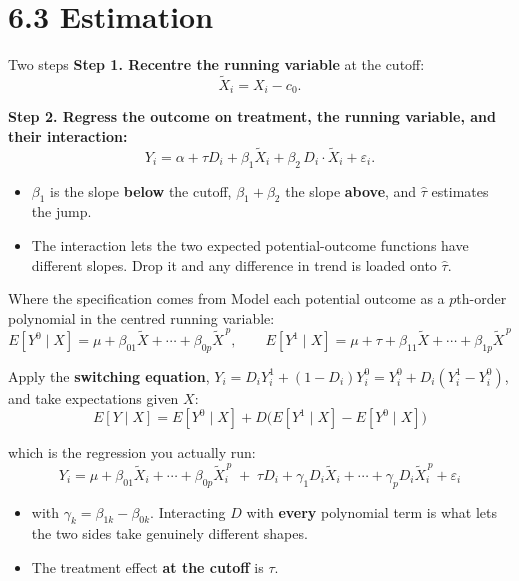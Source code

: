 \documentclass[
  11pt,
  ignorenonframetext,
  aspectratio=169,
]{beamer}
\providecommand{\tightlist}{%
  \setlength{\itemsep}{0pt}\setlength{\parskip}{0pt}}
\begin{document}
\section{6.3 Estimation}\label{estimation}

\begin{frame}{Two steps}
\protect{}\label{two-steps}
\textbf{Step 1. Recentre the running variable} at the cutoff: \[
\tilde X_i = X_i - c_0 .
\]

\textbf{Step 2. Regress the outcome on treatment, the running variable,
and their interaction:} \[
Y_i = \alpha + \tau D_i + \beta_1 \tilde X_i + \beta_2\, D_i \cdot \tilde X_i + \varepsilon_i .
\]

\begin{itemize}
\tightlist
\item
  \(\beta_1\) is the slope \textbf{below} the cutoff,
  \(\beta_1 + \beta_2\) the slope \textbf{above}, and \(\hat\tau\)
  estimates the jump.
\item
  The interaction lets the two expected potential-outcome functions have
  different slopes. Drop it and any difference in trend is loaded onto
  \(\hat\tau\).
\end{itemize}
\end{frame}

\begin{frame}{Where the specification comes from}
\protect{}\label{where-the-specification-comes-from}
Model each potential outcome as a \(p\)th-order polynomial in the
centred running variable: \[
E[Y^0 \mid X] = \mu + \beta_{01}\tilde X + \cdots + \beta_{0p}\tilde X^{\,p}, \qquad
E[Y^1 \mid X] = \mu + \tau + \beta_{11}\tilde X + \cdots + \beta_{1p}\tilde X^{\,p}
\]

Apply the \textbf{switching equation},
\(Y_i = D_i Y^1_i + (1 - D_i)Y^0_i = Y^0_i + D_i(Y^1_i - Y^0_i)\), and
take expectations given \(X\): \[
E[Y \mid X] = E[Y^0 \mid X] + D\big(E[Y^1 \mid X] - E[Y^0 \mid X]\big)
\]

which is the regression you actually run: \[
Y_i = \mu + \beta_{01}\tilde X_i + \cdots + \beta_{0p}\tilde X_i^{\,p}
\;+\; \tau D_i + \gamma_1 D_i \tilde X_i + \cdots + \gamma_p D_i \tilde X_i^{\,p} + \varepsilon_i
\]

\begin{itemize}
\tightlist
\item
  with \(\gamma_k = \beta_{1k} - \beta_{0k}\). Interacting \(D\) with
  \textbf{every} polynomial term is what lets the two sides take
  genuinely different shapes.
\item
  The treatment effect \textbf{at the cutoff} is \(\tau\).
\end{itemize}
\end{frame}
\end{document}
